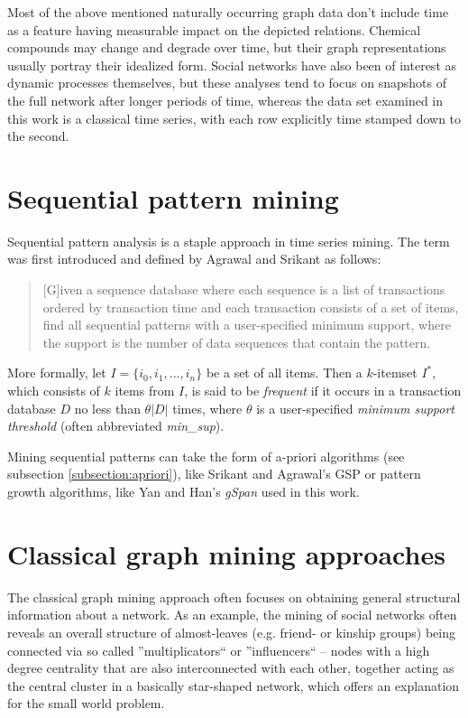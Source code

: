 \documentclass[pdftex,12pt,a4paper]{report}
\begin{document}
Most of the above mentioned naturally occurring graph data don't include time as a feature having measurable impact on the depicted relations. Chemical compounds may change and degrade over time, but their graph representations usually portray their idealized form. Social networks have also been of interest as dynamic processes themselves,\cite{Kossinets2006-rw} but these analyses tend to focus on snapshots of the full network after longer periods of time, whereas the data set examined in this work is a classical time series, with each row explicitly time stamped down to the second.

\section{Sequential pattern mining}
Sequential pattern analysis is a staple approach in time series mining. The term was first introduced and defined by Agrawal and Srikant\cite{Agrawal1994-ca} as follows: 
\begin{quotation}
	[G]iven a sequence database where each sequence is a list of transactions ordered by transaction time and each transaction consists of a set of items, find all sequential patterns with a user-specified minimum support, where the support is the number of data sequences that contain the pattern.
\end{quotation}

More formally, let $I = \{i_0, i_1, ..., i_n\}$ be a set of all items. Then a $k$-itemset $I^*$, which consists of $k$ items from $I$, is said to be \textit{frequent} if it occurs in a transaction database $D$ no less than $\theta|D|$ times, where $\theta$ is a user-specified \textit{minimum support threshold} (often abbreviated \textit{min\_sup}).

Mining sequential patterns can take the form of a-priori algorithms (see subsection \ref{subsection:apriori}), like Srikant and Agrawal's GSP\cite{Srikant1996-dy} or pattern growth algorithms, like Yan and Han's \textit{gSpan}\cite{Yan2002-sj} used in this work.

\section{Classical graph mining approaches}
The classical graph mining approach often focuses on obtaining general structural information about a network. As an example, the mining of social networks often reveals an overall structure of almost-leaves (e.g. friend- or kinship groups) being connected via so called ''multiplicators`` or ''influencers`` -- nodes with a high degree centrality\cite{Newman2010-ac} that are also interconnected with each other, together acting as the central cluster in a basically star-shaped network, which offers an explanation for the small world problem\cite{Travers1967-cn}.
\end{document}
